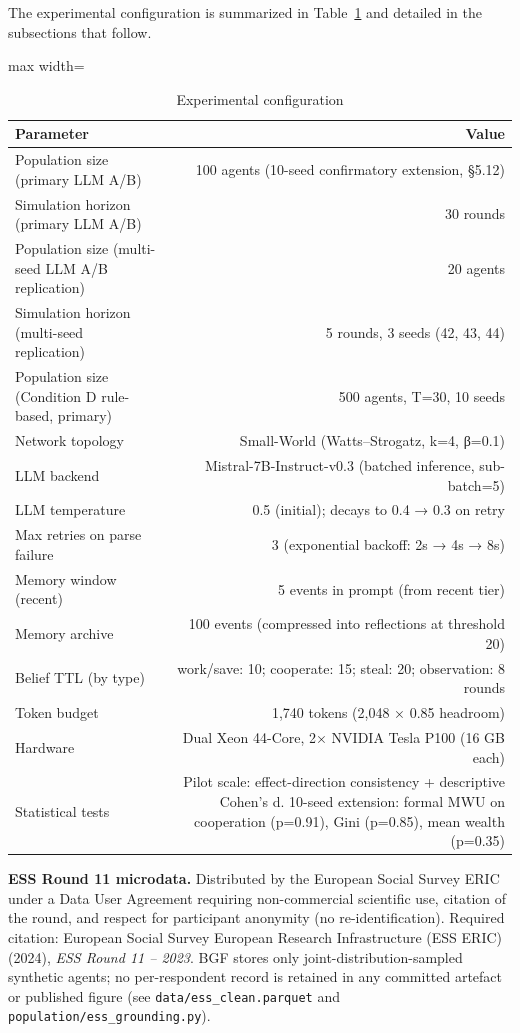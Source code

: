 
The experimental configuration is summarized in Table~\ref{tab:2} and detailed in the subsections that follow.


\begin{table}[H]
\centering
\caption{Experimental configuration}
\label{tab:2}
\footnotesize
\begin{adjustbox}{max width=\textwidth}
\begin{tabular}{lr}
\toprule
Parameter & Value \\
\midrule
Population size (primary LLM A/B) & 100 agents (10-seed confirmatory extension, §5.12) \\
Simulation horizon (primary LLM A/B) & 30 rounds \\
Population size (multi-seed LLM A/B replication) & 20 agents \\
Simulation horizon (multi-seed replication) & 5 rounds, 3 seeds (42, 43, 44) \\
Population size (Condition D rule-based, primary) & 500 agents, T=30, 10 seeds \\
Network topology & Small-World (Watts–Strogatz, k=4, β=0.1) \\
LLM backend & Mistral-7B-Instruct-v0.3 (batched inference, sub-batch=5) \\
LLM temperature & 0.5 (initial); decays to 0.4 → 0.3 on retry \\
Max retries on parse failure & 3 (exponential backoff: 2s → 4s → 8s) \\
Memory window (recent) & 5 events in prompt (from recent tier) \\
Memory archive & 100 events (compressed into reflections at threshold 20) \\
Belief TTL (by type) & work/save: 10; cooperate: 15; steal: 20; observation: 8 rounds \\
Token budget & 1,740 tokens (2,048 × 0.85 headroom) \\
Hardware & Dual Xeon 44-Core, 2× NVIDIA Tesla P100 (16 GB each) \\
Statistical tests & Pilot scale: effect-direction consistency + descriptive Cohen's d. 10-seed extension: formal MWU on cooperation (p=0.91), Gini (p=0.85), mean wealth (p=0.35) \\
\bottomrule
\end{tabular}
\end{adjustbox}
\end{table}


\textbf{ESS Round 11 microdata.} Distributed by the European Social Survey ERIC under a Data User Agreement requiring non-commercial scientific use, citation of the round, and respect for participant anonymity (no re-identification). Required citation: European Social Survey European Research Infrastructure (ESS ERIC) (2024), \textit{ESS Round 11 – 2023}. BGF stores only joint-distribution-sampled synthetic agents; no per-respondent record is retained in any committed artefact or published figure (see \texttt{data/ess\_clean.parquet} and \texttt{population/ess\_grounding.py}).

